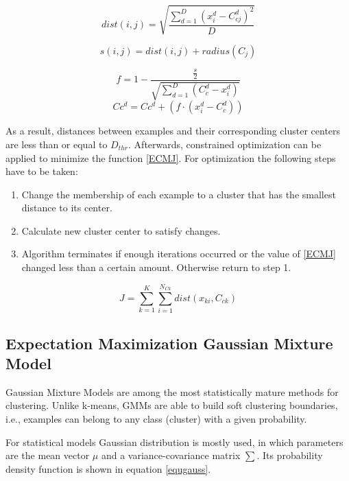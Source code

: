 \documentclass[conference]{IEEEtran}
\begin{document}
\begin{equation}\label{ECMdist}
dist(i,j) = \sqrt{ \frac {\sum_{d=1}^{D} (x_i^d - C_{cj}^d)^2} {D}}
\end{equation}

\begin{equation}\label{ECMequ1}
s(i, j) = dist(i,j) + radius(C_j)
\end{equation}

\begin{equation}\label{ECMequ2}
f = 1 - \frac {\frac {s} {2}} {\sqrt{ \sum_{d=1}^{D} (C_c^d - x_i^d)}}
\end{equation}
\begin{equation}\label{ECMequ3}
Cc^d = Cc^d + (f \cdot (x_i^d - C_c^d))
\end{equation}

As a result, distances between examples and their corresponding cluster centers are less than or equal to $D_{thr}$.
Afterwards, constrained optimization can be applied to minimize the function \ref{ECMJ}. For optimization the following steps have to be taken:
\begin{enumerate}
	\item Change the membership of each example to a cluster that has the smallest distance to its center.
	\item Calculate new cluster center to satisfy changes.
	\item Algorithm terminates if enough iterations occurred or the value of \ref{ECMJ} changed less than a certain amount.
		Otherwise return to step 1.
\end{enumerate}

\begin{equation}\label{ECMJ}
	J = \sum_{k=1}^K \sum_{i=1}^{N_{Ck}} dist(x_{ki}, C_{ck})
\end{equation}


\subsection{Expectation Maximization Gaussian Mixture Model}

Gaussian Mixture Models are among the most statistically mature methods for clustering. Unlike k-means,
GMMs are able to build soft clustering boundaries, i.e., examples can belong to any class (cluster) with a given probability.

For statistical models Gaussian distribution is mostly used, in which parameters are the mean vector $\mu$ and a
variance-covariance matrix $\sum$. Its probability density function is shown in equation \ref{equgauss}.
\end{document}
